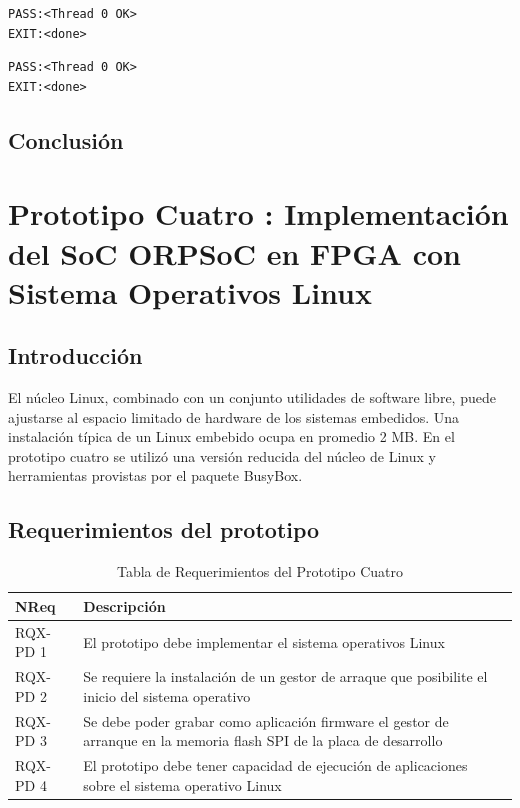 \newpage

\begin{lstlisting}[frame=single,caption={Salida de la ejecución del programa de prueba twothreads},label={lst:salhilos}]
PASS:<Thread 0 OK>
EXIT:<done>
\end{lstlisting}



\begin{lstlisting}[frame=single,caption={Salida de la ejecución del programa de prueba threads0},label={lst:salhilos}]
PASS:<Thread 0 OK>
EXIT:<done>
\end{lstlisting}



		\section{Conclusión}
		
		
		
		
		
		
		


\newpage
\chapter{Prototipo Cuatro : Implementación del SoC ORPSoC en FPGA con Sistema Operativos Linux} \label{chap:proto4}
		\section{Introducción}
		El núcleo Linux, combinado con un conjunto utilidades de software libre, puede ajustarse al espacio limitado de hardware 
	    de los sistemas embedidos. Una instalación típica de un Linux embebido ocupa en promedio 2 MB. En el prototipo cuatro se utilizó una versión
	    reducida del núcleo de Linux y herramientas provistas por el paquete BusyBox. 
		
		\section{Requerimientos del prototipo}
		
		\begin{table}[h!]
		\centering	
		\begin{tabular}{ p{2.5cm} p{8cm} p{3cm} }
		\hline 
		\rowcolor[gray]{0.8} N\textordmasculine Req  & Descripción\\
		\hline                             	RQX-PD 1 & El prototipo debe implementar el sistema operativos Linux\\ 
		\hline  						RQX-PD 2 & Se requiere la instalación de un gestor de arraque que posibilite el inicio del sistema operativo\\ 
		\hline 						RQX-PD 3 & Se debe poder grabar como aplicación firmware el gestor de arranque en la memoria flash SPI de la placa de desarrollo\\
		\hline 						RQX-PD 4 & El prototipo debe tener capacidad de ejecución de aplicaciones sobre el sistema operativo Linux\\
		\hline 
		\end{tabular}
		\caption{Tabla de Requerimientos del Prototipo Cuatro}
		\end{table}
		
